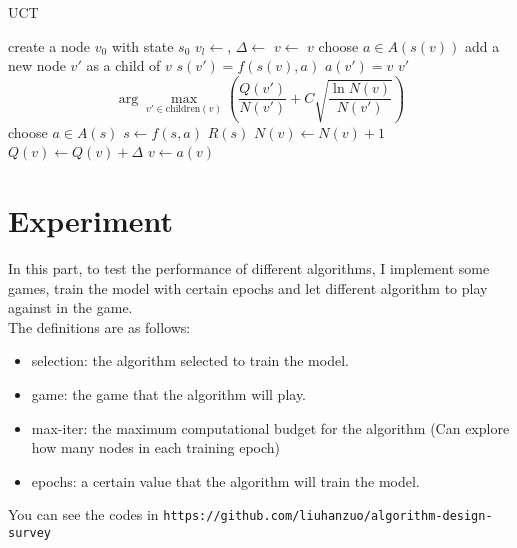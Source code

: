 \documentclass{article}
\begin{document}
\begin{algorithm}[H]
    \caption{UCT}
    \begin{algorithmic}[1]
            \State create a node $v_0$ with state $s_0$
                \State $v_l\gets$, $\Delta\gets$
                \State {}
            \EndWhile
            \State \Return {}
        \EndFunction
                    \State \Return {}
                \Else
                    \State $v\gets$
                \EndIf
            \EndWhile
            \State \Return $v$
        \EndFunction
            \State choose $a\in A(s(v))$
            \State add a new node $v'$ as a child of $v$
            \State $s(v')=f(s(v),a)$
            \State $a(v')=v$
            \State \Return $v'$
        \EndFunction
            \State \Return $$\arg\max_{v'\in \text{children}(v)}\left(\frac{Q(v')}{N(v')}+C\sqrt{\frac{\ln N(v)}{N(v')}}\right)$$
        \EndFunction
                \State choose $a\in A(s)$
                \State $s\gets f(s,a)$
            \EndWhile
            \State \Return $R(s)$
        \EndFunction
                \State $N(v)\gets N(v)+1$
                \State $Q(v)\gets Q(v)+\Delta$
                \State $v\gets a(v)$
            \EndWhile
        \EndFunction
    \end{algorithmic}
    \label{alg:uct}
\end{algorithm}
\section{Experiment}
In this part, to test the performance of different algorithms, I implement some games, train the model with certain epochs and let different algorithm to play against in the game.\\
The definitions are as follows:
\begin{itemize}
    \item selection: the algorithm selected to train the model.
    \item game: the game that the algorithm will play.
    \item max-iter: the maximum computational budget for the algorithm (Can explore how many nodes in each training epoch)
    \item epochs: a certain value that the algorithm will train the model.
\end{itemize}
You can see the codes in \texttt{https://github.com/liuhanzuo/algorithm-design-survey}
\end{document}
